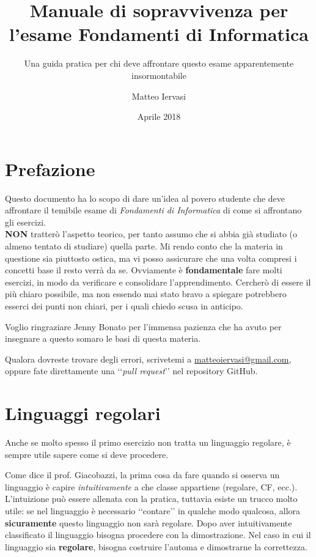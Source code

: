 \documentclass[a4paper,oneside]{scrbook}
\title{Manuale di sopravvivenza per l'esame Fondamenti di Informatica}
\subtitle{Una guida pratica per chi deve affrontare questo esame apparentemente insormontabile}
\author{Matteo Iervasi}
\date{Aprile 2018}
\begin{document}
	
\maketitle
\tableofcontents

\chapter*{Prefazione}
Questo documento ha lo scopo di dare un'idea al povero studente che deve affrontare il temibile esame di \textit{Fondamenti di Informatica} di come si affrontano gli esercizi.\\
\textbf{{\large NON}} tratterò l'aspetto teorico, per tanto assumo che si abbia già studiato (o almeno tentato di studiare) quella parte.
Mi rendo conto che la materia in questione sia piuttosto ostica, ma vi posso assicurare che una volta compresi i concetti base il resto verrà da se.
Ovviamente è \textbf{fondamentale} fare molti esercizi, in modo da verificare e consolidare l'apprendimento. Cercherò di essere il più chiaro possibile, ma non essendo mai stato bravo
a spiegare potrebbero esserci dei punti non chiari, per i quali chiedo scusa in anticipo.

Voglio ringraziare Jenny Bonato per l'immensa pazienza che ha avuto per insegnare a questo somaro le basi di questa materia.

Qualora dovreste trovare degli errori, scrivetemi a \href{mailto:matteoiervasi@gmail.com}{matteoiervasi@gmail.com}, oppure fate direttamente una ‘‘\textit{pull request}’’ nel repository GitHub.

\chapter{Linguaggi regolari}
Anche se molto spesso il primo esercizio non tratta un linguaggio regolare, è sempre utile sapere come si deve procedere.

Come dice il prof. Giacobazzi, la prima cosa da fare quando si osserva un linguaggio è capire \textit{intuitivamente} a che classe appartiene (regolare, CF, ecc.).
L'intuizione può essere allenata con la pratica, tuttavia esiste un trucco molto utile: se nel linguaggio è necessario ‘‘contare’’ in qualche modo qualcosa, allora \textbf{sicuramente}
questo linguaggio non sarà regolare. Dopo aver intuitivamente classificato il linguaggio bisogna procedere con la dimostrazione. Nel caso in cui il linguaggio sia \textbf{regolare}, bisogna costruire l'automa e dimostrarne la correttezza.
\end{document}
